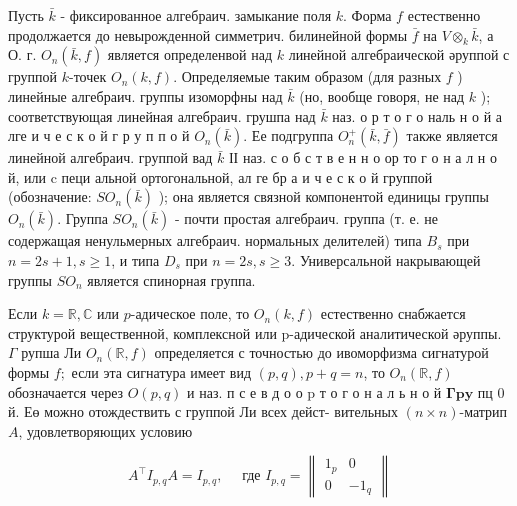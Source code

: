 \documentclass[10pt]{article}
\begin{document}
Пусть $\bar{k}$ - фиксированное алгебраич. замыкание поля $k$. Форма $f$ естественно продолжается до невырожденной симметрич. билинейной формы $\bar{f}$ на $V \otimes_{k} \bar{k}$, а О. г. $O_{n}(\bar{k}, f)$ является определенвой над $k$ линейной алгебраической әруппой с группой $k$-точек $O_{n}(k, f)$. Определяемые таким образом (для разных $f$ ) линейные алгебраич. группы изоморфны над $\bar{k}$ (но, вообще говоря, не над $k$ ); соответствующая линейная алгебраич. грушпа над $\bar{k}$ наз. о р т о г о наль н о й а лге и ч е с к о й г р у п п о й $O_{n}(\bar{k})$. Ее подгруппа $O_{n}^{+}(\bar{k}, \bar{f})$ также является линейной алгебраич. группой вад $\bar{k}$ ІІ наз. с о б с т в е н н о ор то г о н а л н о й, или c пеци альной ортогональной, ал ге бр а и ч е с к о й группой (обозначение: $S O_{n}(\bar{k})$ ); она является связной компонентой единицы группы $O_{n}(\bar{k})$. Группа $S O_{n}(\bar{k})$ - почти простая алгебраич. группа (т. е. не содержащая ненульмерных алгебраич. нормальных делителей) типа $B_{s}$ при $n=2 s+1, s \geqslant 1$, и типа $D_{s}$ при $n=2 s, s \geqslant 3$. Универсальной накрывающей группы $S O_{n}$ является спинорная группа.



Если $k=\mathbb{R}, \mathbb{C}$ или $p$-адическое поле, то $O_{n}(k, f)$ естественно снабжается структурой вещественной, комплексной или p-адической аналитической әруппы. $\Gamma$ рупша Ли $O_{n}(\mathbb{R}, f)$ определяется с точностью до ивоморфизма сигнатурой формы $f ;$ если эта сигнатура имеет вид $(p, q), p+q=n$, то $O_{n}(\mathbb{R}, f)$ обозначается через $O(p, q)$ и наз. п с е в д о о $\mathrm{p}$ т о г о н а л ь н о й $\mathbf{\Gamma} \mathbf{p} \mathbf{y}$ пц 0 й. Еө можно отождествить с группой Ли всех дейст- вительных $(n \times n)$-матрип $A$, удовлетворяющих условию



\[

A^{\top} I_{p, q} A=I_{p, q}, \quad \text { где } I_{p, q}=\left\|\begin{array}{cc}

1_{p} & 0 \\

0 & -1_{q}

\end{array}\right\|

\]
\end{document}

